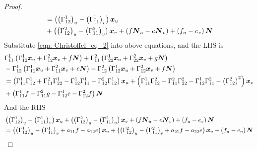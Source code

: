 \documentclass[11pt]{article}
\begin{document}
\begin{itemize}
\begin{proof}
\begin{align*}
&= \left(\left(\Gamma_{12}^{1}\right)_{u}-\left(\Gamma_{11}^{1}\right)_{v}\right)\boldsymbol{x}_{u} \\
&+\left(  \left(\Gamma_{12}^{2}\right)_{u}- \left(\Gamma_{11}^{2}\right)_{v}\right)\boldsymbol{x}_{v} +\left(f\boldsymbol{N}_{u} - e\boldsymbol{N}_{v}\right)+ \left(f_{u}-e_{v}\right)\boldsymbol{N}
\end{align*}
Substitute \eqref{eqn: Christoffel_eq_2} into above equations, and the LHS is 
\begin{align*}
&\Gamma_{11}^{1}\left(\Gamma_{12}^{1}\boldsymbol{x}_{u} + \Gamma_{12}^{2}\boldsymbol{x}_{v} + f\boldsymbol{N}\right) + \Gamma_{11}^{2}\left(\Gamma_{22}^{1}\boldsymbol{x}_{u} + \Gamma_{22}^{2}\boldsymbol{x}_{v} + g\boldsymbol{N}\right)\\
& - \Gamma_{12}^{1}\left(\Gamma_{11}^{1}\boldsymbol{x}_{u} + \Gamma_{11}^{2}\boldsymbol{x}_{v} + e\boldsymbol{N}\right) - \Gamma_{12}^{2}\left(\Gamma_{12}^{1}\boldsymbol{x}_{u} + \Gamma_{12}^{2}\boldsymbol{x}_{v} + f\boldsymbol{N}\right)\\
&=   \left(\Gamma_{11}^{1}\Gamma_{12}^{1} +   \Gamma_{11}^{2}\Gamma_{22}^{1} - \Gamma_{12}^{1}\Gamma_{11}^{1}   - \Gamma_{12}^{2}\Gamma_{12}^{1}  \right)\boldsymbol{x}_{u} 
+  \left(\Gamma_{11}^{1}\Gamma_{12}^{2} + \Gamma_{11}^{2}\Gamma_{22}^{2} - \Gamma_{12}^{1}\Gamma_{11}^{2}     - \left(\Gamma_{12}^{2}\right)^{2}  \right)\boldsymbol{x}_{v} \\
& + \left(\Gamma_{11}^{1}f + \Gamma_{11}^{2}g   - \Gamma_{12}^{1}e - \Gamma_{12}^{2}f \right)\boldsymbol{N}
\end{align*}
And the RHS
\begin{align*}
&\left(\left(\Gamma_{12}^{1}\right)_{u}-\left(\Gamma_{11}^{1}\right)_{v}\right)\boldsymbol{x}_{u} +\left(  \left(\Gamma_{12}^{2}\right)_{u}- \left(\Gamma_{11}^{2}\right)_{v}\right)\boldsymbol{x}_{v} +\left(f\boldsymbol{N}_{u} - e\boldsymbol{N}_{v}\right)+ \left(f_{u}-e_{v}\right)\boldsymbol{N}\\
&=\left(\left(\Gamma_{12}^{1}\right)_{u}-\left(\Gamma_{11}^{1}\right)_{v} + a_{11}f - a_{12}e\right)\boldsymbol{x}_{u}
+\left(\left(\Gamma_{12}^{2}\right)_{u}- \left(\Gamma_{11}^{2}\right)_{v} + a_{21}f - a_{22}e\right)\boldsymbol{x}_{v}+ \left(f_{u}-e_{v}\right)\boldsymbol{N} 
\end{align*}


\end{proof}
\end{itemize}
\end{document}
